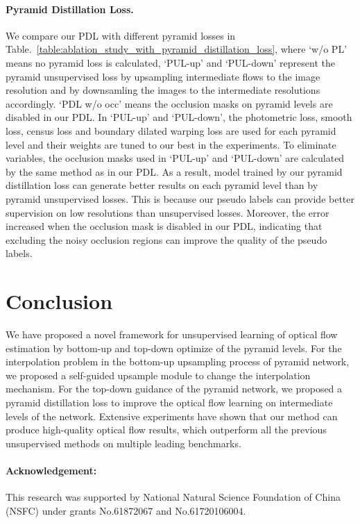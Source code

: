 \documentclass[final]{cvpr}
\begin{document}
\paragraph{Pyramid Distillation Loss. }
We compare our PDL with different pyramid losses in Table.~\ref{table:ablation_study_with_pyramid_distillation_loss}, where `w/o PL' means no pyramid loss is calculated, `PUL-up' and `PUL-down' represent the pyramid unsupervised loss by upsampling intermediate flows to the image resolution and by downsamling the images to the intermediate resolutions accordingly. `PDL w/o occ' means the occlusion masks on pyramid levels are disabled in our PDL. 
In `PUL-up' and `PUL-down', the photometric loss, smooth loss, census loss and boundary dilated warping loss are used for each pyramid level and their weights are tuned to our best in the experiments. 
To eliminate variables, the occlusion masks used in `PUL-up' and `PUL-down' are calculated by the same method as in our PDL. 
As a result, model trained by our pyramid distillation loss can generate better results on each pyramid level than by pyramid unsupervised losses. 
This is because our pseudo labels can provide better supervision on low resolutions than unsupervised losses. 
Moreover, the error increased when the occlusion mask is disabled in our PDL, indicating that excluding the noisy occlusion regions can improve the quality of the pseudo labels.


\section{Conclusion}\label{sec:conclu}
We have proposed a novel framework for unsupervised learning of optical flow estimation by bottom-up and top-down optimize of the pyramid levels. 
For the interpolation problem in the bottom-up upsampling process of pyramid network, we proposed a self-guided upsample module to change the interpolation mechanism. 
For the top-down guidance of the pyramid network, we proposed a pyramid distillation loss to improve the optical flow learning on intermediate levels of the network.  
Extensive experiments have shown that our method can produce high-quality optical flow results, which outperform all the previous unsupervised methods on multiple leading benchmarks. 
\vspace{-14pt}

\paragraph{Acknowledgement:} This research was supported by National Natural Science Foundation of China (NSFC) under grants No.61872067 and No.61720106004.
\end{document}
